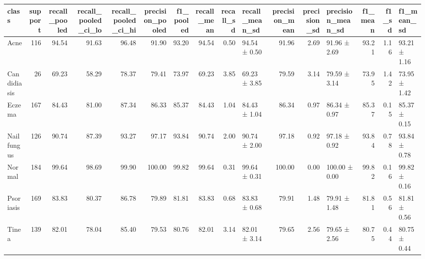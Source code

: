 \begin{tabular}{lrrrrrrrrlrrlrrl}
\toprule
class & support & recall\_pooled & recall\_pooled\_ci\_lo & recall\_pooled\_ci\_hi & precision\_pooled & f1\_pooled & recall\_mean & recall\_sd & recall\_mean\_sd & precision\_mean & precision\_sd & precision\_mean\_sd & f1\_mean & f1\_sd & f1\_mean\_sd \\
\midrule
Acne & 116 & 94.54 & 91.63 & 96.48 & 91.90 & 93.20 & 94.54 & 0.50 & 94.54 ± 0.50 & 91.96 & 2.69 & 91.96 ± 2.69 & 93.21 & 1.16 & 93.21 ± 1.16 \\
Candidiasis & 26 & 69.23 & 58.29 & 78.37 & 79.41 & 73.97 & 69.23 & 3.85 & 69.23 ± 3.85 & 79.59 & 3.14 & 79.59 ± 3.14 & 73.95 & 1.42 & 73.95 ± 1.42 \\
Eczema & 167 & 84.43 & 81.00 & 87.34 & 86.33 & 85.37 & 84.43 & 1.04 & 84.43 ± 1.04 & 86.34 & 0.97 & 86.34 ± 0.97 & 85.37 & 0.15 & 85.37 ± 0.15 \\
Nail fungus & 126 & 90.74 & 87.39 & 93.27 & 97.17 & 93.84 & 90.74 & 2.00 & 90.74 ± 2.00 & 97.18 & 0.92 & 97.18 ± 0.92 & 93.84 & 0.78 & 93.84 ± 0.78 \\
Normal & 184 & 99.64 & 98.69 & 99.90 & 100.00 & 99.82 & 99.64 & 0.31 & 99.64 ± 0.31 & 100.00 & 0.00 & 100.00 ± 0.00 & 99.82 & 0.16 & 99.82 ± 0.16 \\
Psoriasis & 169 & 83.83 & 80.37 & 86.78 & 79.89 & 81.81 & 83.83 & 0.68 & 83.83 ± 0.68 & 79.91 & 1.48 & 79.91 ± 1.48 & 81.81 & 0.56 & 81.81 ± 0.56 \\
Tinea & 139 & 82.01 & 78.04 & 85.40 & 79.53 & 80.76 & 82.01 & 3.14 & 82.01 ± 3.14 & 79.65 & 2.56 & 79.65 ± 2.56 & 80.75 & 0.44 & 80.75 ± 0.44 \\
\bottomrule
\end{tabular}
